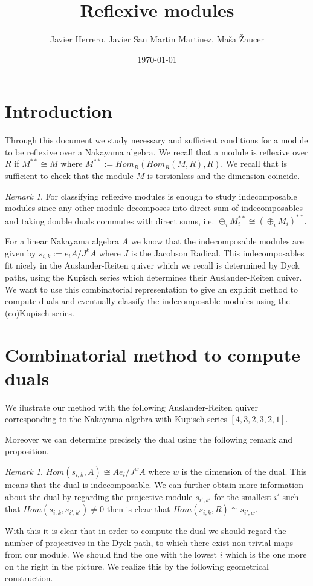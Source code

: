 \documentclass[12pt, a4paper]{article}
\title{Reflexive modules}
\author{Javier Herrero, Javier San Martin Martinez, Maša Žaucer}
\date{\today}
\numberwithin{equation}{section}
\theoremstyle{definition}
\theoremstyle{plain}
\theoremstyle{remark}
\newtheorem{remark}[definition]{Remark}
\begin{document}
\maketitle


\begin{abstract}
\end{abstract}

\section{Introduction}
Through this document we study necessary and sufficient conditions for a module to be reflexive over a Nakayama algebra. We recall that a module is reflexive over $R$ if $M^{**}\cong M$ where $M^{**}:=Hom_R(Hom_R(M,R),R).$ We recall that is sufficient to check that the module $M$ is torsionless and the dimension coincide.
\begin{remark}
    For classifying reflexive modules is enough to study indecomposable modules since any other module decomposes into direct sum of indecomposables and taking double duals commutes with direct sums, i.e. $\oplus_i M_i^{**}\cong (\oplus_iM_i)^{**}.$
\end{remark}
For a linear Nakayama algebra $A$ we know that the indecomposable modules are given by $s_{i,k}:=e_iA/J^kA$ where $J$ is the Jacobson Radical. This indecomposables fit nicely in the Auslander-Reiten quiver which we recall is determined by Dyck paths, using the Kupisch series which determines their Auslander-Reiten quiver. We want to use this combinatorial representation to give an explicit method to compute duals and eventually classify the indecomposable modules using the (co)Kupisch series. 

\section{Combinatorial method to compute duals}
We ilustrate our method with the following Auslander-Reiten quiver corresponding to the Nakayama algebra with Kupisch series $[4,3,2,3,2,1].$

Moreover we can determine precisely the dual using the following remark and proposition.
\begin{remark}
    $Hom(s_{i,k},A)\cong Ae_i/J^wA$ where $w$ is the dimension of the dual. This means that the dual is indecomposable. We can further obtain more information about the dual by regarding the projective module $s_{i',k'}$ for the smallest $i'$ such that $Hom(s_{i,k},s_{i',k'})\neq 0$ then is clear that $Hom(s_{i,k},R)\cong s_{i',w}.$ 
\end{remark}
With this it is clear that in order to compute the dual we should regard the number of projectives in the Dyck path, to which there exist non trivial maps from our module. We should find the one with the lowest $i$ which is the one more on the right in the picture. We realize this by the following geometrical construction. 
\end{document}
